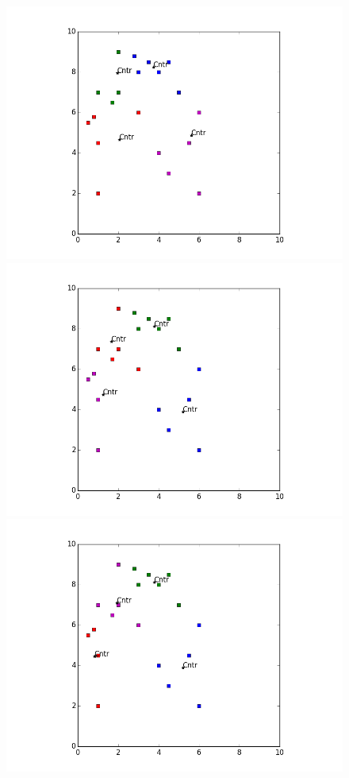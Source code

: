 \documentclass{article}
\begin{document}
\begin{figure}[H]
\includegraphics[scale=0.5,trim={3cm 1cm 3cm 1cm},clip]{3.png}
\includegraphics[scale=0.5,trim={3cm 1cm 3cm 1cm},clip]{4.png}\\
\includegraphics[scale=0.5,trim={3cm 1cm 3cm 1cm},clip]{5.png}

\end{figure}
\end{document}
